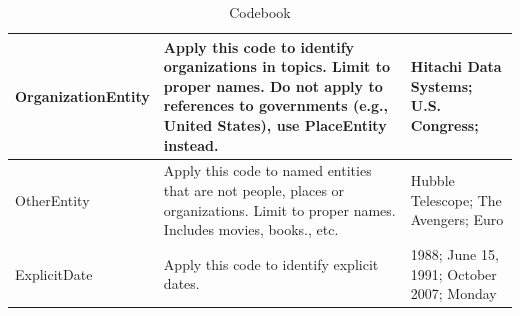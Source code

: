 \documentclass{sig-alternate}
\begin{document}
\begin{table}[H]
\begin{tabular}{| l | p{7cm}  | p{7cm}  |}
OrganizationEntity & Apply this code to identify organizations in topics. Limit to proper names. Do not apply to references to governments (e.g., United States), use PlaceEntity instead. & Hitachi Data Systems; U.S. Congress; \\ \hline
OtherEntity & Apply this code to named entities that are not people, places or organizations. Limit to proper names. Includes movies, books., etc. & Hubble Telescope; The Avengers; Euro	\\ \hline
ExplicitDate & Apply this code to identify explicit dates. & 1988; June 15, 1991; October 2007; Monday \\ \hline
\end{tabular}
\caption{Codebook}
\label{table.codebook}
\end{table}
\end{document}
